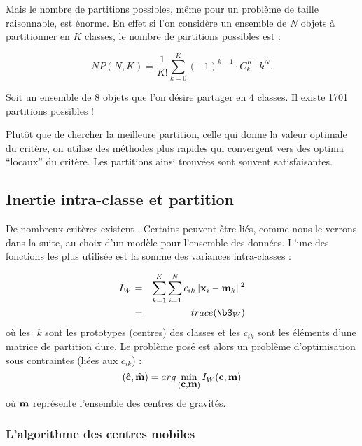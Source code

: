 Mais le nombre de partitions possibles, m\^eme pour un probl\`eme
de taille raisonnable, est \'enorme. En effet si l'on consid\`ere un
ensemble de $N$ objets \`a partitionner en $K$ classes, le nombre de
partitions possibles est :

\begin{equation}
NP(N,K)=\frac{1}{K  !}\sum_{k=0}^{K}(-1)^{k-1}  \cdot C_k^K \cdot k^N.
\end{equation}

\begin{ex}
Soit un ensemble de 8 objets que l'on d\'esire partager en 4 classes. Il existe
1701 partitions possibles   !
\end{ex}

Plut\^ot que de chercher la meilleure partition, celle qui donne 
la valeur optimale du crit\`ere, on utilise des m\'ethodes plus
rapides qui convergent vers des optima ``locaux'' du crit\`ere. Les 
partitions ainsi trouv\'ees sont souvent satisfaisantes.  


\subsection{Inertie intra-classe et partition}

De nombreux crit\`eres existent \cite{Gordon1980}. 
Certains peuvent \^etre li\'es, comme
nous le verrons dans la suite, au choix d'un mod\`ele pour 
l'ensemble des donn\'ees.  L'une des 
fonctions les plus utilis\'ee est la somme des variances intra-classes :

\begin{eqnarray*}
I_W & = & \sum_{k=1}^K \sum_{i=1}^N c_{ik} \| \x_i - \bm_k  \|^2 \\
    & = & trace(\bS_W)
\end{eqnarray*}
o\`u les $\bm_k$ sont les prototypes (centres) des classes et
les $c_{ik}$ sont les \'el\'ements d'une matrice de partition dure.
Le probl\`eme pos\'e est alors un probl\`eme d'optimisation sous
contraintes (li\'ees aux $c_{ik}$) :
\begin{equation}
(\hat{\mbox{\bf c}}, \hat{\mbox{\bf m}})=arg \min_{(\mbox{\bf c}, \mbox{\bf m})}{ I_W(\mbox{\bf c},\mbox{\bf m})}
\end{equation}
o\`u $\mbox{\bf m}$ repr\'esente l'ensemble des centres de gravit\'es.

\subsubsection{L'algorithme des centres mobiles}
\label{sec:algo}

